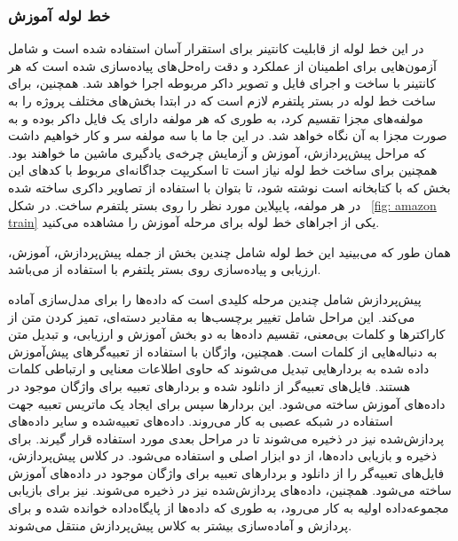 \subsubsection{خط لوله آموزش}
در این خط لوله از قابلیت کانتینر برای استقرار آسان استفاده شده است و شامل آزمون‌هایی برای اطمینان از عملکرد و دقت راه‌حل‌های پیاده‌سازی شده است که هر کانتینر با ساخت و اجرای فایل و تصویر داکر مربوطه اجرا خواهد شد. همچنین، برای ساخت خط لوله در بستر پلتفرم لازم است که در ابتدا بخش‌های مختلف پروژه را به مولفه‌های مجزا تقسیم کرد، به طوری که هر مولفه دارای یک فایل داکر بوده و به صورت مجزا به آن نگاه خواهد شد. در این جا ما با سه مولفه سر و کار خواهیم داشت که مراحل پیش‌پردازش، آموزش و آزمایش چرخه‌ی یادگیری ماشین ما خواهند بود. همچنین برای ساخت خط لوله نیاز است تا اسکریپت جداگانه‌ای مربوط با کدهای این بخش که با کتابخانه  است نوشته شود، تا بتوان با استفاده از تصاویر داکری ساخته شده در هر مولفه، پایپلاین مورد نظر را روی بستر پلتفرم  ساخت. در شکل ~\ref{fig: amazon train} یکی از اجراهای خط لوله  برای مرحله آموزش را مشاهده می‌کنید.

همان طور که می‌بینید این خط لوله شامل چندین بخش از جمله پیش‌پردازش،‌ آموزش،‌ ارزیابی و پیاده‌سازی روی بستر پلتفرم  با استفاده از  می‌باشد.

پیش‌پردازش شامل چندین مرحله کلیدی است که داده‌ها را برای مدل‌سازی آماده می‌کند. این مراحل شامل تغییر برچسب‌ها به مقادیر دسته‌ای، تمیز کردن متن از کاراکترها و کلمات بی‌معنی، تقسیم داده‌ها به دو بخش آموزش و ارزیابی، و تبدیل متن به دنباله‌هایی از کلمات است. همچنین، واژگان با استفاده از تعبیه‌گرهای پیش‌آموزش داده شده  به بردارهایی تبدیل می‌شوند که حاوی اطلاعات معنایی و ارتباطی کلمات هستند. فایل‌های تعبیه‌گر  از  دانلود شده و بردارهای تعبیه برای واژگان موجود در داده‌های آموزش ساخته می‌شود. این بردارها سپس برای ایجاد یک ماتریس تعبیه جهت استفاده در شبکه عصبی به کار می‌روند. داده‌های تعبیه‌شده و سایر داده‌های پردازش‌شده نیز در  ذخیره می‌شوند تا در مراحل بعدی مورد استفاده قرار گیرند. برای ذخیره و بازیابی داده‌ها، از دو ابزار اصلی  و  استفاده می‌شود. در کلاس پیش‌پردازش، فایل‌های تعبیه‌گر  را از  دانلود و بردارهای تعبیه برای واژگان موجود در داده‌های آموزش ساخته می‌شود. همچنین، داده‌های پردازش‌شده نیز در  ذخیره می‌شوند.  نیز برای بازیابی مجموعه‌داده اولیه به کار می‌رود، به طوری که داده‌ها از پایگاه‌داده خوانده شده و برای پردازش و آماده‌سازی بیشتر به کلاس پیش‌پردازش منتقل می‌شوند.


